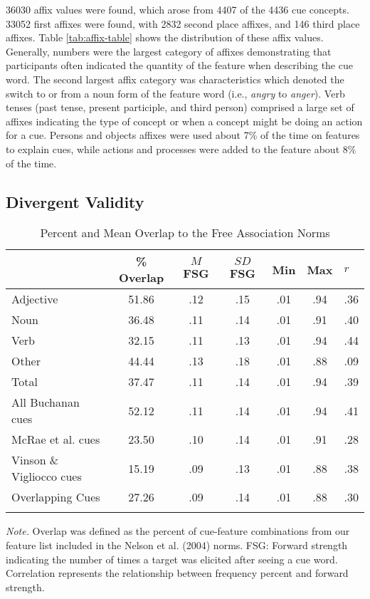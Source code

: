 \documentclass[english,,man]{apa6}
\theoremstyle{definition}
\theoremstyle{definition}
\theoremstyle{definition}
\theoremstyle{remark}
\begin{document}
36030 affix values were found, which arose from 4407 of the 4436 cue
concepts. 33052 first affixes were found, with 2832 second place
affixes, and 146 third place affixes. Table \ref{tab:affix-table} shows
the distribution of these affix values. Generally, numbers were the
largest category of affixes demonstrating that participants often
indicated the quantity of the feature when describing the cue word. The
second largest affix category was characteristics which denoted the
switch to or from a noun form of the feature word (i.e., \emph{angry} to
\emph{anger}). Verb tenses (past tense, present participle, and third
person) comprised a large set of affixes indicating the type of concept
or when a concept might be doing an action for a cue. Persons and
objects affixes were used about 7\% of the time on features to explain
cues, while actions and processes were added to the feature about 8\% of
the time.

\subsection{Divergent Validity}\label{divergent-validity}

\begin{table}[tbp]
\begin{center}
\begin{threeparttable}
\caption{\label{tab:divergent-table}Percent and Mean Overlap to the Free Association Norms}
\begin{tabular}{lcccccl}
\toprule
  & \% Overlap & $M$ FSG & $SD$ FSG & Min & Max & $r$\\
\midrule
Adjective & 51.86 & .12 & .15 & .01 & .94 & .36\\
Noun & 36.48 & .11 & .14 & .01 & .91 & .40\\
Verb & 32.15 & .11 & .13 & .01 & .94 & .44\\
Other & 44.44 & .13 & .18 & .01 & .88 & .09\\
Total & 37.47 & .11 & .14 & .01 & .94 & .39\\
All Buchanan cues & 52.12 & .11 & .14 & .01 & .94 & .41\\
McRae et al. cues & 23.50 & .10 & .14 & .01 & .91 & .28\\
Vinson \& Vigliocco cues & 15.19 & .09 & .13 & .01 & .88 & .38\\
Overlapping Cues & 27.26 & .09 & .14 & .01 & .88 & .30\\
\bottomrule
\addlinespace
\end{tabular}
\begin{tablenotes}[para]
\normalsize{\textit{Note.} Overlap was defined as the percent of cue-feature combinations from our feature list included in the Nelson et al. (2004) norms. FSG: Forward strength indicating the number of times a target was elicited after seeing a cue word. Correlation represents the relationship between frequency percent and forward strength.}
\end{tablenotes}
\end{threeparttable}
\end{center}
\end{table}
\end{document}
